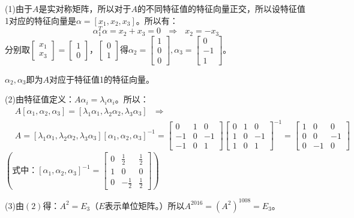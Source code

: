 \documentclass{article}
\begin{document}
\begin{jie}
(1)由于$A$是实对称矩阵，所以对于$A$的不同特征值的特征向量正交，所以设特征值1对应的特征向量是$\alpha=[x_1,x_2,x_3]$。所以有：
\begin{equation*}
\alpha_{1}^T\alpha=x_2+x_3=0~~~\Rightarrow~~~x_2=-x_3
\end{equation*}
分别取$
\begin{bmatrix}
x_1 \\ x_3
\end{bmatrix}=\begin{bmatrix}
1 \\ 0
\end{bmatrix}，
\begin{bmatrix}
0 \\ 1
\end{bmatrix}
$得$\alpha_{2}=
\begin{bmatrix}
1 \\ 0 \\0
\end{bmatrix}
,\alpha_3=
\begin{bmatrix}
0\\ -1 \\1
\end{bmatrix}$。

$\alpha_2,\alpha_3$即为$A$对应于特征值1的特征向量。

(2)由特征值定义：$A\alpha_i=\lambda_i\alpha_i$。所以：
\begin{align*}
&A[\alpha_1,\alpha_2,\alpha_3]=[\lambda_1\alpha_1,\lambda_2\alpha_2,\lambda_3\alpha_3] ~~~\Rightarrow\\
&A=[\lambda_1\alpha_1,\lambda_2\alpha_2,\lambda_3\alpha_3] [\alpha_1,\alpha_2,\alpha_3]^{-1}=
\begin{bmatrix}
  0 & 1  & 0\\
 -1 & 0&-1\\
 -1 & 0& 1
\end{bmatrix}
\begin{bmatrix}
  0 & 1  & 0\\
 1 & 0&-1\\
 1 & 0& 1
\end{bmatrix}^{-1}=
\begin{bmatrix}
  1 & 0  & 0\\
 0 & 0&-1\\
 0 & -1& 0
\end{bmatrix}
\end{align*}
$\left(\text{式中：}[\alpha_1,\alpha_2,\alpha_3]^{-1}=
\begin{bmatrix}
  0 & \frac{1}{2} & \frac{1}{2}\\
 1 & 0&0\\
  0 & -\frac{1}{2} & \frac{1}{2}
\end{bmatrix}
\right)$

(3)由$(2)$得：$A^2=E_3$（$E$表示单位矩阵。）所以$A^{2016}=(A^{2})^{1008}=E_3$。
\end{jie}
\end{document}
